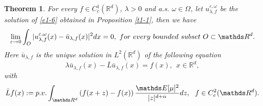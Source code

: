 \documentclass[10pt,a4paper]{amsart}
\newtheorem{theorem}{Theorem}
\newcommand{\Ee}{\mathds E}
\newcommand{\R}{\mathds R}
\newcommand{\e}{\varepsilon}
\newcommand{\w}{\omega}
\begin{document}
\begin{theorem}\label{t1-2}
For every $f\in C_c^1(\R^d)$, $\lambda>0$ and a.s. $\w\in \Omega$, let $u_{\lambda,f}^{\e,\w}$ be the solution
of \eqref{e1-6} obtained in Proposition \ref{t1-1}, then we have
\begin{equation}\label{t1-2-1}
\lim_{\e \to 0}\int_{O}|u_{\lambda,f}^{\e,\w}(x)-\bar u_{\lambda,f}(x)|^2dx=0,\ {\rm for\ every\ bounded\ subset\ } O\subset \R^d.
\end{equation}
Here $\bar u_{\lambda,f}$ is the unique solution in $L^2(\R^d)$ of the following equation
\begin{equation}\label{t1-2-2}
\lambda \bar u_{\lambda,f}(x)-\bar L \bar u_{\lambda,f}(x)=f(x),\ \ x\in \R^d,
\end{equation}
with
$$\bar L f(x):={\rm p.v.}\int_{\R^d}\left(f(x+z)-f(x)\right)\frac{\Ee[\mu]^2}{|z|^{d+\alpha}}dz,\ \ f\in C_c^2(\R^d).$$
\end{theorem}
\end{document}
